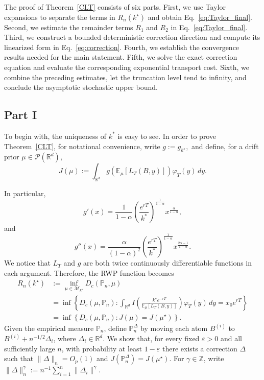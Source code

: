 \documentclass[11pt]{article}
\theoremstyle{definition}
\newcommand{\E}{\mathbb{E}}
\begin{document}
The proof of Theorem~\ref{CLT} consists of six parts. First, we use
Taylor expansions to separate the terms in $R_n(k^\star)$ and obtain
Eq.~\eqref{eq:Taylor_final}. Second, we estimate the remainder terms
$R_1$ and $R_2$ in Eq.~\eqref{eq:Taylor_final}. Third, we construct a
bounded deterministic correction direction and compute its linearized
form in Eq.~\eqref{eq:correction}. Fourth, we establish the convergence
results needed for the main statement. Fifth, we solve the exact
correction equation and evaluate the corresponding exponential
transport cost. Sixth, we combine the preceding estimates, let the
truncation level tend to infinity, and conclude the asymptotic
stochastic upper bound.


\subsection{Part I}
To begin with, the uniqueness of $k^*$ is easy to see. In order to prove Theorem~\ref{CLT}, for notational convenience, write $g:=g_{k^\star},$
and define, for a drift prior $\mu\in\mathcal P(\mathbb R^d)$,
\[
J(\mu)
:=
\int_{\mathbb R^d}
g\!\left(
\E_\mu[L_T(B,y)]
\right)
\varphi_T(y)\,dy.
\]
    
In particular, 
$$
g'(x) = \frac{1}{1-\alpha}\left(\frac{e^{rT}}{k^*}\right)^{\frac{1}{1-\alpha}}x^{\frac{\alpha}{1-\alpha}},
$$
and 
$$
g''(x) = \frac{\alpha}{(1-\alpha)^2}\left(\frac{e^{rT}}{k^*}\right)^{\frac{1}{1-\alpha}}x^{\frac{2\alpha - 1}{1-\alpha}}.
$$    
We notice that $L_T$ and $g$ are both twice continuously differentiable functions in each argument. Therefore, the RWP function becomes 
    \begin{align*}
R_n(k^\star)
&:=
\inf_{\mu \in \mathcal{M}_{k^\star}}
D_c(\mathbb{P}_n,\mu)
\\
&=
\inf\left\{
D_c(\mu,\mathbb{P}_n):
\int_{\mathbb{R}^d}
I\left(
\frac{k^\star e^{-rT}}
{\mathbb{E}_{\mu}\left[L_T(B,y)\right]}
\right)
\varphi_T(y)\,dy
=
x_0e^{rT}
\right\}
\\
&=
\inf\left\{
D_c(\mu,\mathbb{P}_n):
J(\mu)=J(\mu^\star)
\right\}.
\end{align*}
{Given the empirical measure $\mathbb P_n$, define $\mathbb P_n^\Delta$ by
moving each atom $B^{(i)}$ to $B^{(i)}+n^{-1/2}\Delta_i$, where
$\Delta_i\in\mathbb R^d$. We show that, for every fixed $\varepsilon>0$ and
all sufficiently large $n$, with probability at least $1-\varepsilon$ there
exists a correction $\Delta$ such that $\|\Delta\|_n=O_p(1)$ and
$J(\mathbb P_n^\Delta)=J(\mu^\star)$. For $\gamma\in\mathbb Z$, write
$\|\Delta\|_n^\gamma:=n^{-1}\sum_{i=1}^n\|\Delta_i\|^\gamma$.}
\end{document}
